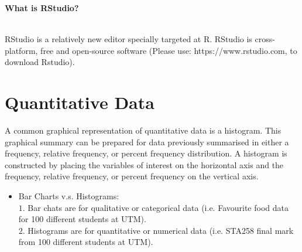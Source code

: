 \textbf{What is RStudio?}

\\

RStudio is a relatively new editor specially targeted at R. RStudio is cross-platform, free and open-source software (Please use: https://www.rstudio.com, to download Rstudio).

\newpage

\section{Quantitative Data}

A common graphical representation of quantitative data is a histogram. This graphical summary can be prepared for data previously summarised in either a frequency, relative frequency, or percent frequency distribution. A histogram is constructed by placing the variables of interest on the horizontal axis and the frequency, relative frequency, or percent frequency on the vertical axis.
\\

\begin{itemize}
	\item Bar Charts v.s. Histograms: \\
	$1.$ Bar chats are for qualitative or categorical data (i.e. Favourite food data for 100 different students at UTM). \\
	$2.$ Histograms are for quantitative or numerical data (i.e. STA258 final mark from 100 different students at UTM).
\end{itemize}

